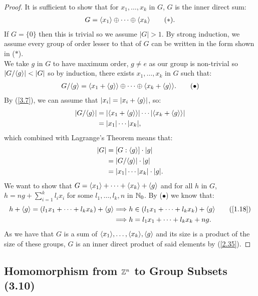 \begin{proof}
    It is sufficient to show that for $x_1, \ldots, x_k$ in $G$, $G$
    is the inner direct sum: \begin{align*}
        G = {\langle x_1 \rangle} \oplus \cdots \oplus {\langle x_k \rangle} \tag{$\ast$}.
    \end{align*} If $G = \{0\}$ then this is trivial so we assume $|G| > 1$.
    By strong induction, we assume every group of order lesser to that of
    $G$ can be written in the form shown in ($\ast$).
    \\[\baselineskip]
    We take $g$ in $G$ to have maximum order, $g \neq e$ as our group is
    non-trivial so $|G / {\langle g \rangle}| < |G|$ so by induction, there exists
    $x_1, \ldots, x_k$ in $G$ such that: \begin{align*}
        G / {\langle g \rangle} = {\langle x_1 + {\langle g \rangle} \rangle} \oplus \cdots \oplus
        {\langle x_k + {\langle g \rangle} \rangle}. \tag{$\bullet$}
    \end{align*} By (\ref{3.7}), we can assume that $|x_i| = |x_i + {\langle g \rangle}|$, 
    so: \begin{align*}
        |G/{\langle g \rangle}| 
        &= |{\langle x_1 + {\langle g \rangle} \rangle}| \cdots |{\langle x_k + {\langle g \rangle} \rangle}| \\
        &= |x_1| \cdots |x_k|,
    \end{align*} which combined with Lagrange's Theorem means that: \begin{align*}
        |G| 
        &= [G : {\langle g \rangle}] \cdot |g| \\
        &= |G / {\langle g \rangle}| \cdot |g| \\
        &= |x_1| \cdots |x_k| \cdot |g|.
    \end{align*} We want to show that $G = {\langle x_1 \rangle} + \cdots + {\langle x_k \rangle} + {\langle g \rangle}$
    and for all $h$ in $G$, $h = ng + \sum_{i = 1}^k l_ix_i$ for some
    $l_1, \ldots, l_k, n$ in $\mathbb{N}_0$. By ($\bullet$) we know that: \begin{align*}
        h + \ang{g} = (l_1x_1 + \cdots + l_kx_k) + \ang{g}
        &\Longrightarrow
        h \in (l_1x_1 + \cdots + l_kx_k) + \ang{g} \tag{\ref{1.18}} \\
        &\Longrightarrow
        h = l_1x_1 + \cdots + l_kx_k + ng.
    \end{align*} As we have that $G$ is a sum of ${\langle x_1 \rangle}, \ldots, {\langle x_k \rangle},
    {\langle g \rangle}$ and its size is a product of the size of these groups, $G$
    is an inner direct product of said elements by (\ref{2.35}).
\end{proof}

\subsection{Homomorphism from $\mathbb{Z}^n$ to Group Subsets (3.10)} \label{3.10}

